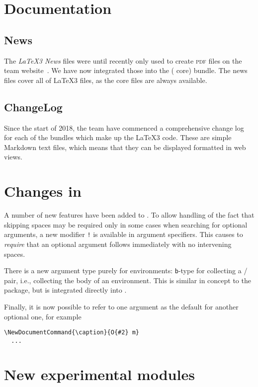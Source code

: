 \documentclass{ltnews}
\begin{document}
\section{Documentation}

\subsection{News}

The \emph{\LaTeX3 News} files were until recently only used to create
\textsc{pdf} files on the team website~\cite{12:site}. We have now
integrated those into the  ( core)
bundle. The news files cover all of \LaTeX3 files, as the core files
are always available.

\subsection{ChangeLog}

Since the start of 2018, the team have commenced a comprehensive
change log for each of the bundles which make up the \LaTeX3 code.
These are simple Markdown text files, which means that they can be displayed
formatted in web views.

\section{Changes in }

A number of new features have been added to . To allow
handling of the fact that skipping spaces may be required only in
some cases when searching for optional arguments, a new modifier
\texttt{!} is available in argument specifiers. This causes
 to \emph{require} that an optional argument follows
immediately with no intervening spaces.

There is a new argument type purely for environments: \texttt{b}-type
for collecting a / pair, i.e., collecting the body of
an environment. This is similar in concept to the  package,
but is integrated directly into .

Finally, it is now possible to refer to one argument as the
default for another optional one, for example
\begin{verbatim}
\NewDocumentCommand{\caption}{O{#2} m}
  ...
\end{verbatim}

\section{New experimental modules}
\end{document}
